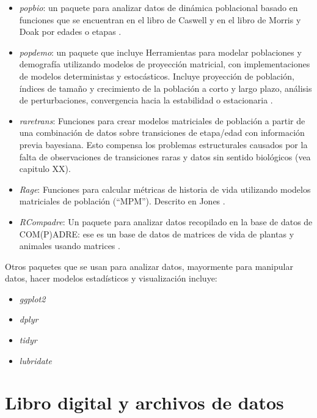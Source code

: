 \documentclass[
]{book}
\providecommand{\tightlist}{%
  \setlength{\itemsep}{0pt}\setlength{\parskip}{0pt}}
\theoremstyle{definition}
\theoremstyle{definition}
\theoremstyle{definition}
\theoremstyle{definition}
\theoremstyle{remark}
\begin{document}
\begin{itemize}
\item
  \emph{popbio}: un paquete para analizar datos de dinámica poblacional basado en funciones que se encuentran en el libro de Caswell \citep{caswell2001matrix} y en el libro de Morris y Doak \citep{morris2002quantitative} por edades o etapas \citep{popbio2007}.
\item
  \emph{popdemo}: un paquete que incluye Herramientas para modelar poblaciones y demografía utilizando modelos de proyección matricial, con implementaciones de modelos deterministas y estocásticos. Incluye proyección de población, índices de tamaño y crecimiento de la población a corto y largo plazo, análisis de perturbaciones, convergencia hacia la estabilidad o estacionaria \citep{popdemo2021}.
\item
  \emph{raretrans}: Funciones para crear modelos matriciales de población a partir de una combinación de datos sobre transiciones de etapa/edad con información previa bayesiana. Esto compensa los problemas estructurales causados por la falta de observaciones de transiciones raras y datos sin sentido biológicos \citep{raretrans2024} (vea capitulo XX).
\item
  \emph{Rage}: Funciones para calcular métricas de historia de vida utilizando modelos matriciales de población (``MPM''). Descrito en Jones \citep{Rage2022}.
\item
  \emph{RCompadre}: Un paquete para analizar datos recopilado en la base de datos de COM(P)ADRE: ese es un base de datos de matrices de vida de plantas y animales usando matrices \citep{jones2022rcompadre}.
\end{itemize}

Otros paquetes que se usan para analizar datos, mayormente para manipular datos, hacer modelos estadísticos y visualización incluye:

\begin{itemize}
\tightlist
\item
  \emph{ggplot2}
\item
  \emph{dplyr}
\item
  \emph{tidyr}
\item
  \emph{lubridate}
\end{itemize}

\section{Libro digital y archivos de datos}\label{libro-digital-y-archivos-de-datos}
\end{document}
